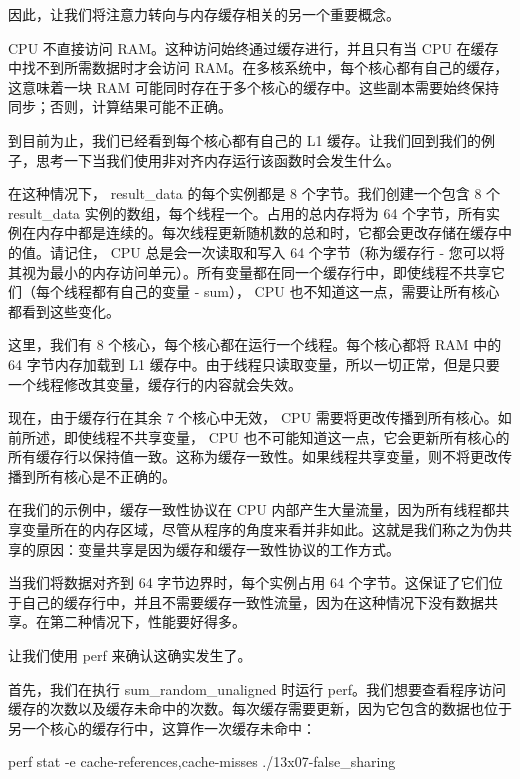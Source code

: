 因此，让我们将注意力转向与内存缓存相关的另一个重要概念。


CPU 不直接访问 RAM。这种访问始终通过缓存进行，并且只有当 CPU 在缓存中找不到所需数据时才会访问 RAM。在多核系统中，每个核心都有自己的缓存，这意味着一块 RAM 可能同时存在于多个核心的缓存中。这些副本需要始终保持同步；否则，计算结果可能不正确。

到目前为止，我们已经看到每个核心都有自己的 L1 缓存。让我们回到我们的例子，思考一下当我们使用非对齐内存运行该函数时会发生什么。

在这种情况下， result\_data 的每个实例都是 8 个字节。我们创建一个包含 8 个 result\_data 实例的数组，每个线程一个。占用的总内存将为 64 个字节，所有实例在内存中都是连续的。每次线程更新随机数的总和时，它都会更改存储在缓存中的值。请记住， CPU 总是会一次读取和写入 64 个字节（称为缓存行 - 您可以将其视为最小的内存访问单元）。所有变量都在同一个缓存行中，即使线程不共享它们（每个线程都有自己的变量 - sum）， CPU 也不知道这一点，需要让所有核心都看到这些变化。

这里，我们有 8 个核心，每个核心都在运行一个线程。每个核心都将 RAM 中的 64 字节内存加载到 L1 缓存中。由于线程只读取变量，所以一切正常，但是只要一个线程修改其变量，缓存行的内容就会失效。

现在，由于缓存行在其余 7 个核心中无效， CPU 需要将更改传播到所有核心。如前所述，即使线程不共享变量， CPU 也不可能知道这一点，它会更新所有核心的所有缓存行以保持值一致。这称为缓存一致性。如果线程共享变量，则不将更改传播到所有核心是不正确的。

在我们的示例中，缓存一致性协议在 CPU 内部产生大量流量，因为所有线程都共享变量所在的内存区域，尽管从程序的角度来看并非如此。这就是我们称之为伪共享的原因：变量共享是因为缓存和缓存一致性协议的工作方式。

当我们将数据对齐到 64 字节边界时，每个实例占用 64 个字节。这保证了它们位于自己的缓存行中，并且不需要缓存一致性流量，因为在这种情况下没有数据共享。在第二种情况下，性能要好得多。

让我们使用 perf 来确认这确实发生了。

首先，我们在执行 sum\_random\_unaligned 时运行 perf。我们想要查看程序访问缓存的次数以及缓存未命中的次数。每次缓存需要更新，因为它包含的数据也位于另一个核心的缓存行中，这算作一次缓存未命中：

\begin{shell}
perf stat -e cache-references,cache-misses ./13x07-false_sharing
\end{shell}


